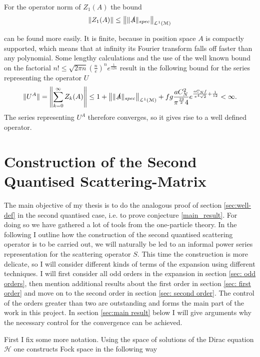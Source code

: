 \documentclass[b5paper,draft,openbib,12pt]{memoir}
\begin{document}
For the operator norm of \(Z_1 (A)\) the bound
\begin{equation}
\|Z_1(A)\|\le \left\| \|\slashed{A}\|_{spec} \right\|_{\mathcal{L}^1(\mathcal{M})}
\end{equation}

can be found more easily. It is finite, because in position space \(A\) is compactly supported, which means that at infinity its Fourier transform falls off faster than any polynomial.
Some lengthy calculations and the use of the well known bound on the factorial \(n!\le \sqrt{2\pi n} \left(\frac{n}{e}\right)^n e^\frac{1}{12n}\)  result in the following bound for the series representing the operator \(U\)
\begin{multline}
\|U^A\|=\left\|\sum_{k=0}^\infty Z_k(A) \right\|
\le  1+ \left\| \|\slashed{A}\|_{spec} \right\|_{\mathcal{L}^1(\mathcal{M})} + f g \frac{a    C^2_N }{\pi^{\frac{19}{2}}4}
 e^{\frac{a C_N f}{\pi^4\sqrt{2}}+\frac{1}{12}} <\infty.
\end{multline}
The series representing \(U^A\) therefore converges, so it gives rise to a well defined operator.


\section{Construction of the Second Quantised Scattering-Matrix}\label{sec:second quant}
The main objective of my thesis is to do the analogous proof of section
\ref{sec:well-def} in the second quantised case, %
i.e. to prove conjecture
\ref{main_result}. For doing so we have gathered a lot of tools from the
one-particle theory. In the following I outline how the construction of the
second quantised scattering operator is to be carried out, we will naturally be
led to an informal power series representation for the scattering operator \(S\). This time the construction is more delicate, so I will consider different kinds of terms of the expansion using different techniques. 
I will first consider all odd orders in the expansion in section \ref{sec: odd orders}, 
then mention additional results about the first order in section \ref{sec:
first order} and move on to the second order in section \ref{sec: second
order}. The control of the orders greater than two are outstanding and forms the main
part of the work in this project. In section \ref{sec:main result} below I
will give arguments why the necessary control for the convergence can be
achieved.

First I fix some more notation. Using the space of solutions of the Dirac equation \(\mathcal{H}\)
one constructs Fock space in the following way
\end{document}
